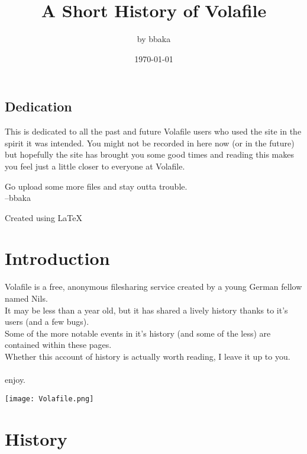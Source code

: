 \documentclass[12pt]{report}
\begin{document}
\setcounter{secnumdepth}{2}
{


\title{A Short History of Volafile}
\author{by bbaka\footnotemark}
\date{\today}
\maketitle
\tableofcontents
\pagebreak


\vfill
\section*{Dedication}
\parbox{\textwidth}{This is dedicated to all the past and future Volafile users who used the site in the spirit it was intended. You might not be recorded in here now (or in the future) but hopefully the site has brought you some good times and reading this makes you feel just a little closer to everyone at Volafile. \\ 
	\raggedright Go upload some more files and stay outta trouble.\\
		\raggedleft 
	--bbaka\\
}

\vfill

{ 
	\centering Created using \LaTeX 
}

\pagebreak

\chapter*{Introduction}
	Volafile is a free, anonymous filesharing service created by a young German fellow named Nils.\\
	It may be less than a year old, but it has shared a lively history thanks to it's users (and a few bugs). \\
	Some of the more notable events in it's history (and some of the less) are contained within these pages.\\
	Whether this account of history is actually worth reading, I leave it up to you.\\ \\
enjoy.

\begin{image}
	\centering
	\texttt{[image: Volafile.png]}
\end{image}

\vfill
\pagebreak

\chapter{History}

}
\end{document}

